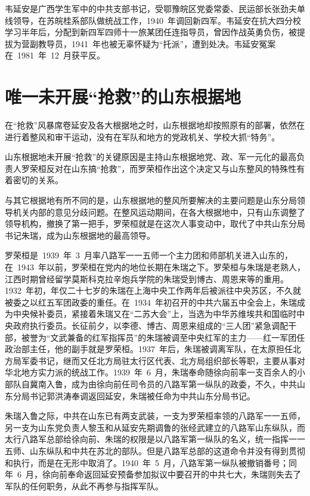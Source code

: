 韦延安是广西学生军中的中共支部书记，受鄂豫皖区党委常委、民运部长张劲夫单线领导，在苏皖桂系部队做统战工作，1940~年调回新四军。韦延安在抗大四分校学习半年后，分配到新四军四师十一旅某团任连指导员，曾因作战英勇负伤，被提拔为营副教导员，1941~年也被无辜怀疑为“托派”，遭到处决。韦延安冤案在~1981~年~12~月获平反。

\section{唯一未开展“抢救”的山东根据地}

在“抢救”风暴席卷延安及各大根据地之时，山东根据地却按照原有的部署，依然在进行着整风和审干运动，没有在军队和地方的党政机关、学校大抓“特务”。

山东根据地未开展“抢救”的关键原因是主持山东根据地党、政、军一元化的最高负责人罗荣桓反对在山东搞“抢救”，而罗荣桓作出这个决定又与山东整风的特殊性有着密切的关系。

与其它根据地有所不同的是，山东根据地的整风所要解决的主要问题是山东分局领导机关内部的意见分歧问题。在整风运动期间，在各大根据地中，只有山东调整了领导机构，撤换了第一把手，罗荣桓就是在这次人事变动中，取代了中共山东分局书记朱瑞，成为山东根据地的最高领导。

罗荣桓是~1939~年~3~月率八路军一一五师一个主力团和师部机关进入山东的，在~1943~年以前，罗荣桓在党内的地位长期在朱瑞之下。罗荣桓与朱瑞是老熟人，江西时期曾经留学莫斯科克拉辛炮兵学院的朱瑞受到博古、周恩来等的重用。1932~年初，年仅二十七岁的朱瑞在上海中央工作两年后被派往中央苏区，不久就被委之以红五军团政委的重任。在~1934~年初召开的中共六届五中全会上，朱瑞成为中央候补委员，紧接着朱瑞又在“二苏大会”上，当选为中华苏维埃共和国临时中央政府执行委员。长征前夕，以李德、博古、周恩来组成的“三人团”紧急调配干部，被誉为“文武兼备的红军指挥员”的朱瑞被调至中央红军的主力——红一军团任政治部主任，他的副手就是罗荣桓。1937~年后，朱瑞被调离军队，在太原担任北方局军委书记，继而又任北方局驻太行区代表、北方局组织部长等职，主要从事对华北地方实力派的统战工作。1939~年~6~月，朱瑞奉命随徐向前率一支百余人的小部队自冀南入鲁，成为由徐向前任司令员的八路军第一纵队的政委，不久，中共山东分局书记郭洪涛奉调返回延安，朱瑞被任命为中共山东分局书记。

朱瑞入鲁之际，中共在山东已有两支武装，一支为罗荣桓率领的八路军一一五师，另一支为山东党负责人黎玉和从延安先期调鲁的张经武建立的八路军山东纵队，而太行八路军总部给徐向前、朱瑞的权限是以八路军第一纵队的名义，统一指挥一一五师、山东纵队和中共在苏北的部队。但是八路军总部的这道命令并没有得到贯彻和执行，而是在无形中取消了。1940~年~5~月，八路军第一纵队被撤销番号；同年~6~月，徐向前奉命返回延安预备参加拟议中要召开的中共七大，朱瑞则失去了军队的任何职务，从此不再参与指挥军队。

